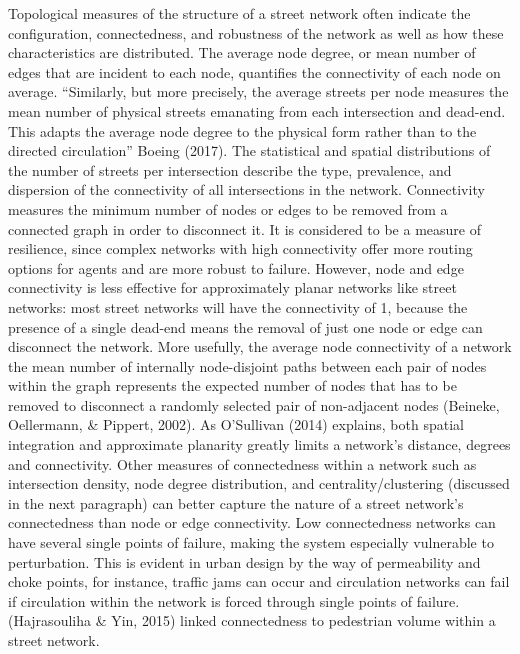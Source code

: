 Topological measures of the structure of a street network often indicate the configuration, connectedness, and robustness of the network as well as how these characteristics are distributed. The average node degree, or mean number of edges that are incident to each node, quantifies the connectivity of each node on average. “Similarly, but more precisely, the average streets per node measures the mean number of physical streets emanating from each intersection and dead-end. This adapts the average node degree to the physical form rather than to the directed circulation” Boeing (2017). The statistical and spatial distributions of the number of streets per intersection describe the type, prevalence, and dispersion of the connectivity of all intersections in the network. Connectivity measures the minimum number of nodes or edges to be removed from a connected graph in order to disconnect it. It is considered to be a measure of resilience, since complex networks with high connectivity offer more routing options for agents and are more robust to failure. However, node and edge connectivity is less effective for approximately planar networks like street networks: most street networks will have the connectivity of 1, because the presence of a single dead-end means the removal of just one node or edge can disconnect the network. More usefully, the average node connectivity of a network the mean number of internally node-disjoint paths between each pair of nodes within the graph represents the expected number of nodes that has to be removed to disconnect a randomly selected pair of non-adjacent nodes (Beineke, Oellermann, \& Pippert, 2002). As O'Sullivan (2014) explains, both spatial integration and approximate planarity greatly limits a network’s distance, degrees and connectivity. Other measures of connectedness within a network such as intersection density, node degree distribution, and centrality/clustering (discussed in the next paragraph) can better capture the nature of a street network's connectedness than node or edge connectivity. Low connectedness networks can have several single points of failure, making the system especially vulnerable to perturbation. This is evident in urban design by the way of permeability and choke points, for instance, traffic jams can occur and circulation networks can fail if circulation within the network is forced through single points of failure. (Hajrasouliha \& Yin, 2015) linked connectedness to pedestrian volume within a street network.

